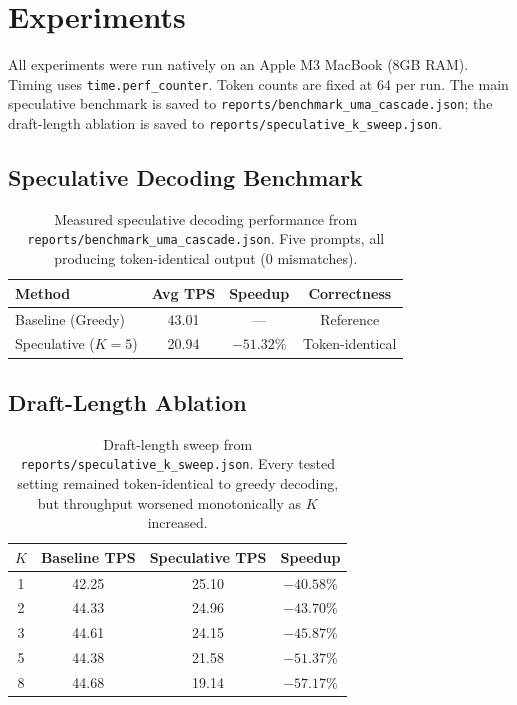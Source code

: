 \documentclass[11pt]{article}
\begin{document}
\section{Experiments}

All experiments were run natively on an Apple M3 MacBook (8GB RAM). Timing uses \texttt{time.perf\_counter}. Token counts are fixed at 64 per run. The main speculative benchmark is saved to \texttt{reports/benchmark\_uma\_cascade.json}; the draft-length ablation is saved to \texttt{reports/speculative\_k\_sweep.json}.

\subsection{Speculative Decoding Benchmark}

\begin{table}[h]
\centering
\begin{tabular}{@{}lccc@{}}
\toprule
\textbf{Method} & \textbf{Avg TPS} & \textbf{Speedup} & \textbf{Correctness} \\ \midrule
Baseline (Greedy)   & 43.01 & ---      & Reference   \\
Speculative ($K=5$) & 20.94 & $-51.32\%$ & Token-identical \\ \bottomrule
\end{tabular}
\vspace{2mm}
\caption{Measured speculative decoding performance from \texttt{reports/benchmark\_uma\_cascade.json}. Five prompts, all producing token-identical output (0 mismatches).}
\label{tab:spec}
\end{table}

\subsection{Draft-Length Ablation}

\begin{table}[h]
\centering
\begin{tabular}{@{}cccc@{}}
\toprule
\textbf{$K$} & \textbf{Baseline TPS} & \textbf{Speculative TPS} & \textbf{Speedup} \\ \midrule
1 & 42.25 & 25.10 & $-40.58\%$ \\
2 & 44.33 & 24.96 & $-43.70\%$ \\
3 & 44.61 & 24.15 & $-45.87\%$ \\
5 & 44.38 & 21.58 & $-51.37\%$ \\
8 & 44.68 & 19.14 & $-57.17\%$ \\ \bottomrule
\end{tabular}
\vspace{2mm}
\caption{Draft-length sweep from \texttt{reports/speculative\_k\_sweep.json}. Every tested setting remained token-identical to greedy decoding, but throughput worsened monotonically as $K$ increased.}
\label{tab:ksweep}
\end{table}
\end{document}
